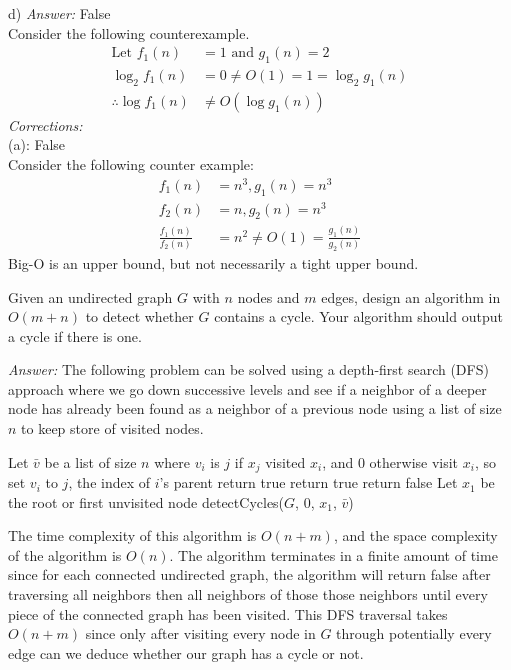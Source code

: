 \documentclass[12pt]{article}
\newenvironment{problem}[2][Problem]{\begin{trivlist}
\item[\hskip \labelsep {\bfseries #1}\hskip \labelsep {\bfseries #2.}]}{\end{trivlist}}
\begin{document}
d) \textit{Answer: } False\\
Consider the following counterexample.
\begin{align*}
\text{Let } f_1(n)&=1 \text{ and }g_1(n) = 2\\ 
\log_2 f_1(n)&= 0 \neq O(1) = 1 = \log_2 g_1(n)\\
\therefore \log f_1(n) &\neq O(\log g_1(n))
\end{align*}
\textit{Corrections:}\\
(a): False\\
Consider the following counter example:
\begin{align*}
	f_1(n)&=n^3, g_1(n)=n^3\\ 
	f_2(n)&=n, g_2(n)=n^3 \\
	\frac{f_1(n)}{f_2(n)}&=n^2\neq O(1) =\frac{g_1(n)}{g_2(n)}
\end{align*}
Big-O is an upper bound, but not necessarily a tight upper bound.
\begin{problem}{3}
Given an undirected graph $G$ with $n$ nodes and $m$ edges, design an algorithm in $O(m+n)$ to detect whether $G$ contains a cycle. Your algorithm should output a cycle if there is one. 
\end{problem}
\textit{Answer: }
The following problem can be solved using a depth-first search (DFS) approach where we go down successive levels and see if a neighbor of a deeper node has already been found as a neighbor of a previous node using a list of size $n$ to keep store of visited nodes.

\begin{algorithmic}
\State Let $\bar{v}$ be a list of size $n$ where $v_i$ is $j$ if $x_j$ visited $x_i$, and 0 otherwise
	\State visit $x_i$, so set $v_i$ to $j$, the index of $i$'s parent
				\State return true
			\EndIf
			\State return true
		\EndIf
	\EndFor
	\State return false
\EndProcedure
{}
	\State Let $x_1$ be the root or first unvisited node
	\State detectCycles($G$, 0, $x_1$, $\bar{v}$)
\EndWhile
\end{algorithmic}


The time complexity of this algorithm is $O(n + m)$, and the space complexity of the algorithm is $O(n)$.
The algorithm terminates in a finite amount of time since for each connected undirected graph, the algorithm will return false after traversing all neighbors then all neighbors of those those neighbors until every piece of the connected graph has been visited. This DFS traversal takes $O(n+m)$ since only after visiting every node in $G$ through potentially every edge can we deduce whether our graph has a cycle or not.
\end{document}
